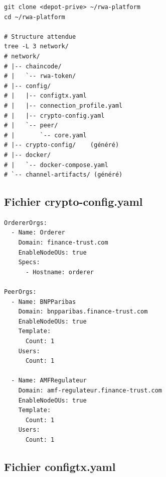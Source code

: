 \documentclass[12pt,a4paper,french]{article}
\begin{document}
\begin{lstlisting}[style=bash, caption={Cloner et structurer le projet}]
git clone <depot-prive> ~/rwa-platform
cd ~/rwa-platform

# Structure attendue
tree -L 3 network/
# network/
# |-- chaincode/
# |   `-- rwa-token/
# |-- config/
# |   |-- configtx.yaml
# |   |-- connection_profile.yaml
# |   |-- crypto-config.yaml
# |   `-- peer/
# |       `-- core.yaml
# |-- crypto-config/    (généré)
# |-- docker/
# |   `-- docker-compose.yaml
# `-- channel-artifacts/ (généré)
\end{lstlisting}

\subsection{Fichier crypto-config.yaml}

\begin{lstlisting}[style=yaml, caption={network/config/crypto-config.yaml}]
OrdererOrgs:
  - Name: Orderer
    Domain: finance-trust.com
    EnableNodeOUs: true
    Specs:
      - Hostname: orderer

PeerOrgs:
  - Name: BNPParibas
    Domain: bnpparibas.finance-trust.com
    EnableNodeOUs: true
    Template:
      Count: 1
    Users:
      Count: 1

  - Name: AMFRegulateur
    Domain: amf-regulateur.finance-trust.com
    EnableNodeOUs: true
    Template:
      Count: 1
    Users:
      Count: 1
\end{lstlisting}

\subsection{Fichier configtx.yaml}
\end{document}

